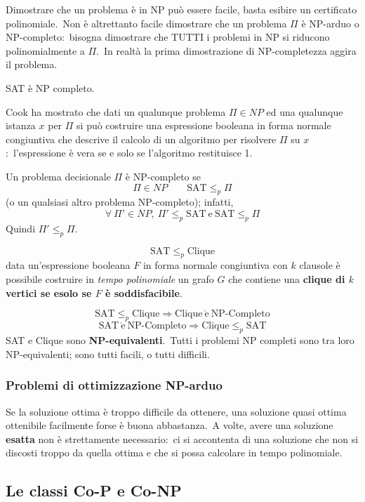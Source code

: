 \noindent Dimostrare che un problema è in NP può essere facile, basta esibire un certificato polinomiale.\
Non è altrettanto facile dimostrare che un problema $\Pi$ è NP-arduo o NP-completo:\ bisogna dimostrare che TUTTI i problemi in NP si riducono polinomialmente a $\Pi$.\
In realtà la prima dimostrazione di NP-completezza aggira il problema.\

\begin{theorem}[Cook, 1971]
    SAT è NP completo.\
\end{theorem}

\noindent Cook ha mostrato che dati un qualunque problema $\Pi \in \mathit{NP}$ ed una qualunque istanza $x$ per $\Pi$ si può costruire una espressione booleana in forma normale congiuntiva che descrive il calcolo di un algoritmo per risolvere $\Pi$ su $x$:\ l'espressione è vera se e solo se l'algoritmo restituisce 1.\

Un problema decisionale $\Pi$ è NP-completo se
\[ \Pi \in \mathit{NP}\qquad \mathrm{SAT} \leq_p \Pi\]
(o un qualsiasi altro problema NP-completo); infatti,
\[\forall\ \Pi' \in \mathit{NP},\ \Pi' \leq_p \mathrm{SAT\ e\ SAT} \leq_p \Pi\]
Quindi $\Pi' \leq_p \Pi$.\

\[\mathrm{SAT} \leq_p \mathrm{Clique} \]
data un'espressione booleana $F$ in forma normale congiuntiva con $k$ clausole è possibile costruire in \textit{tempo polinomiale} un grafo $G$ che contiene una \textbf{clique di $k$ vertici se esolo se $F$ è soddisfacibile}.\

\[\mathrm{SAT} \leq_p \mathrm{Clique} \Rightarrow \mathrm{Clique\ \grave{e}\ NP\textrm{-}Completo}\]
\[\mathrm{SAT\ \grave{e}\ NP\textrm{-}Completo} \Rightarrow \mathrm{Clique} \leq_p \mathrm{SAT}\]
SAT e Clique sono \textbf{NP-equivalenti}.\
Tutti i problemi NP completi sono tra loro NP-equivalenti; sono tutti facili, o tutti difficili.\

\subsubsection{Problemi di ottimizzazione NP-arduo}

Se la soluzione ottima è troppo difficile da ottenere, una soluzione quasi ottima ottenibile facilmente forse è buona abbastanza.\
A volte, avere una so\-luzione \textbf{esatta} non è strettamente necessario:\ ci si accontenta di una soluzione che non si discosti troppo da quella ottima e che si possa calcolare in tempo polinomiale.\

\subsection{Le classi Co-P e Co-NP}

